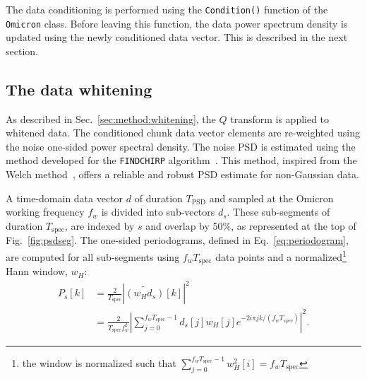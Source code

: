 The data conditioning is performed using the \texttt{Condition()} function of the \texttt{Omicron} class. Before leaving this function, the data power spectrum density is updated using the newly conditioned data vector. This is described in the next section. 


\subsection{The data whitening} \label{sec:algorithm:whitening}

As described in Sec.~\ref{sec:method:whitening}, the $Q$ transform is applied to whitened data. The conditioned chunk data vector elements are re-weighted using the noise one-sided power spectral density. The noise PSD is estimated using the method developed for the \texttt{FINDCHIRP} algorithm~\cite{Allen:2005fk}. This method, inspired from the Welch method~\cite{Welch:1967}, offers a reliable and robust PSD estimate for non-Gaussian data.

A time-domain data vector $d$ of duration $T_\mathrm{PSD}$ and sampled at the Omicron working frequency $f_w$ is divided into sub-vectors $d_s$. These sub-segments of duration $T_\mathrm{spec}$, are indexed by $s$ and overlap by 50\%, as represented at the top of Fig.~\ref{fig:psdseg}. The one-sided periodograms, defined in Eq.~\ref{eq:periodogram}, are computed for all sub-segments using $f_wT_\mathrm{spec}$ data points and a normalized\footnote{the window is normalized such that $\sum_{j=0}^{f_wT_\mathrm{spec}-1}{w_H^2[i]} = f_wT_\mathrm{spec}$} Hann window, $w_H$:
\begin{align}
  P_s[k] &= \frac{2}{T_\mathrm{spec}}\left|\widetilde{(w_Hd_s)}[k]\right|^2 \\
  &= \frac{2}{T_\mathrm{spec}f_w^2}\left|\sum_{j=0}^{f_wT_\mathrm{spec}-1}{d_s[j]w_H[j]e^{-2i\pi jk/(f_wT_{spec})}}\right|^2.
\end{align}

